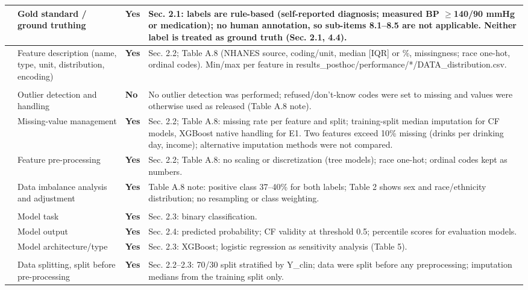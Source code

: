 \documentclass[9pt]{extarticle}
\begin{document}
\begin{longtable}{>{\raggedright\arraybackslash}p{1.0cm}>{\raggedright\arraybackslash}p{7.2cm}>{\centering\arraybackslash}p{1.4cm}>{\raggedright\arraybackslash}p{14.6cm}}
8 & Gold standard / ground truthing & \textbf{Yes} & Sec. 2.1: labels are rule-based (self-reported diagnosis; measured BP $\geq$140/90 mmHg or medication); no human annotation, so sub-items 8.1--8.5 are not applicable. Neither label is treated as ground truth (Sec. 2.1, 4.4).\\ \midrule
9 & Feature description (name, type, unit, distribution, encoding) & \textbf{Yes} & Sec. 2.2; Table A.8 (NHANES source, coding/unit, median [IQR] or \%, missingness; race one-hot, ordinal codes). Min/max per feature in results\_posthoc/performance/*/DATA\_distribution.csv.\\ \midrule
\multicolumn{4}{l}{\textbf{Data preparation}}\\ \midrule
10 & Outlier detection and handling & \textbf{No} & No outlier detection was performed; refused/don't-know codes were set to missing and values were otherwise used as released (Table A.8 note).\\ \midrule
11 & Missing-value management & \textbf{Yes} & Sec. 2.2; Table A.8: missing rate per feature and split; training-split median imputation for CF models, XGBoost native handling for E1. Two features exceed 10\% missing (drinks per drinking day, income); alternative imputation methods were not compared.\\ \midrule
12 & Feature pre-processing & \textbf{Yes} & Sec. 2.2; Table A.8: no scaling or discretization (tree models); race one-hot; ordinal codes kept as numbers.\\ \midrule
13 & Data imbalance analysis and adjustment & \textbf{Yes} & Table A.8 note: positive class 37--40\% for both labels; Table 2 shows sex and race/ethnicity distribution; no resampling or class weighting.\\ \midrule
\multicolumn{4}{l}{\textbf{Modeling}}\\ \midrule
14 & Model task & \textbf{Yes} & Sec. 2.3: binary classification.\\ \midrule
15 & Model output & \textbf{Yes} & Sec. 2.4: predicted probability; CF validity at threshold 0.5; percentile scores for evaluation models.\\ \midrule
16 & Model architecture/type & \textbf{Yes} & Sec. 2.3: XGBoost; logistic regression as sensitivity analysis (Table 5).\\ \midrule
\multicolumn{4}{l}{\textbf{Validation}}\\ \midrule
17 & Data splitting, split before pre-processing & \textbf{Yes} & Sec. 2.2--2.3: 70/30 split stratified by Y\_clin; data were split before any preprocessing; imputation medians from the training split only.\\ \midrule

\end{longtable}
\end{document}
